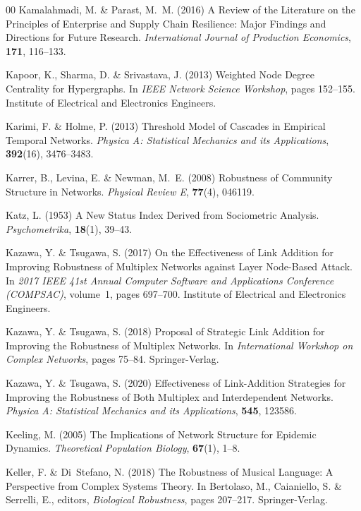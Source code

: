 \documentclass{comnet-mod}
\begin{document}
\begin{thebibliography}{00}
Kamalahmadi, M. {\&} Parast, M.~M. (2016)  {A Review of the Literature on the
  Principles of Enterprise and Supply Chain Resilience: {{Major}} Findings and
  Directions for Future Research}. {\em {International Journal of Production
  Economics}}, \textbf{171}, 116--133.

Kapoor, K., Sharma, D. {\&} Srivastava, J. (2013)  {Weighted Node Degree
  Centrality for Hypergraphs}. In {\em {{{IEEE}} Network Science Workshop}},
  pages 152--155. {Institute of Electrical and Electronics Engineers}.

Karimi, F. {\&} Holme, P. (2013)  {Threshold Model of Cascades in Empirical
  Temporal Networks}. {\em {Physica A: Statistical Mechanics and its
  Applications}}, \textbf{392}(16), 3476--3483.

Karrer, B., Levina, E. {\&} Newman, M.~E. (2008)  {Robustness of Community
  Structure in Networks}. {\em {Physical Review E}}, \textbf{77}(4), 046119.

Katz, L. (1953)  {A New Status Index Derived from Sociometric Analysis}. {\em
  {Psychometrika}}, \textbf{18}(1), 39--43.

Kazawa, Y. {\&} Tsugawa, S. (2017)  {On the Effectiveness of Link Addition for
  Improving Robustness of Multiplex Networks against Layer Node-Based Attack}.
  In {\em {2017 {{IEEE}} 41st Annual Computer Software and Applications
  Conference ({{COMPSAC}})}}, volume~1, pages 697--700. {Institute of
  Electrical and Electronics Engineers}.

Kazawa, Y. {\&} Tsugawa, S. (2018)  {Proposal of Strategic Link Addition for
  Improving the Robustness of Multiplex Networks}. In {\em {International
  Workshop on Complex Networks}}, pages 75--84. {Springer-Verlag}.

Kazawa, Y. {\&} Tsugawa, S. (2020)  {Effectiveness of Link-Addition Strategies
  for Improving the Robustness of Both Multiplex and Interdependent Networks}.
  {\em {Physica A: Statistical Mechanics and its Applications}}, \textbf{545},
  123586.

Keeling, M. (2005)  {The Implications of Network Structure for Epidemic
  Dynamics}. {\em {Theoretical Population Biology}}, \textbf{67}(1), 1--8.

Keller, F. {\&} Di~Stefano, N. (2018)  {The Robustness of Musical Language:
  {{A}} Perspective from Complex Systems Theory}. In Bertolaso, M., Caianiello,
  S. {\&} Serrelli, E., editors, {\em {Biological Robustness}}, pages 207--217.
  {Springer-Verlag}.


\end{thebibliography}
\end{document}
